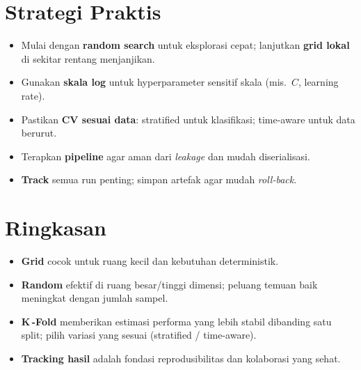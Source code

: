 \documentclass[11pt,a4paper]{article}
\begin{document}
\section{Strategi Praktis}
\begin{itemize}[leftmargin=1.2em]
  \item Mulai dengan \textbf{random search} untuk eksplorasi cepat; lanjutkan \textbf{grid lokal} di sekitar rentang menjanjikan.
  \item Gunakan \textbf{skala log} untuk hyperparameter sensitif skala (mis.\ $C$, learning rate).
  \item Pastikan \textbf{CV sesuai data}: stratified untuk klasifikasi; time-aware untuk data berurut.
  \item Terapkan \textbf{pipeline} agar aman dari \emph{leakage} dan mudah diserialisasi.
  \item \textbf{Track} semua run penting; simpan artefak agar mudah \emph{roll-back}.
\end{itemize}

\section{Ringkasan}
\begin{itemize}[leftmargin=1.2em]
  \item \textbf{Grid} cocok untuk ruang kecil dan kebutuhan deterministik.
  \item \textbf{Random} efektif di ruang besar/tinggi dimensi; peluang temuan baik meningkat dengan jumlah sampel.
  \item \textbf{K\,-Fold} memberikan estimasi performa yang lebih stabil dibanding satu split; pilih variasi yang sesuai (stratified / time-aware).
  \item \textbf{Tracking hasil} adalah fondasi reprodusibilitas dan kolaborasi yang sehat.
\end{itemize}
\end{document}
